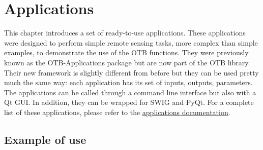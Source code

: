 \chapter{Applications}
\label{sec:Applications}

This chapter introduces a set of ready-to-use applications. 
These applications were designed to perform  simple remote sensing tasks, 
more complex than simple examples, to demonstrate the use of the OTB 
functions. They were previously known as the OTB-Applications 
package but are now part of the OTB library. Their new framework is 
slightly different from before but they can be used pretty much the 
same way: each application has its set of inputs, outputs, parameters. 
The applications can be called through a command line interface but also
with a Qt GUI. In addition, they can be wrapped for SWIG and PyQt. For a 
complete list of these applications, please refer to the 
\href{http://orfeo-toolbox.org/Applications}{applications documentation}.

\section{Example of use}
\label{sec:appExample}
